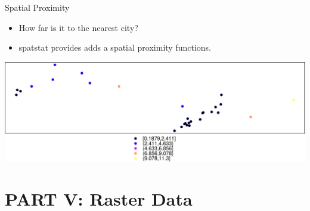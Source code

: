 \documentclass[10pt,ignorenonframetext,]{beamer}
\newenvironment{Shaded}{\begin{snugshade}}{\end{snugshade}}
\newcommand{\KeywordTok}[1]{\textcolor[rgb]{0.13,0.29,0.53}{\textbf{{#1}}}}
\newcommand{\DataTypeTok}[1]{\textcolor[rgb]{0.13,0.29,0.53}{{#1}}}
\newcommand{\StringTok}[1]{\textcolor[rgb]{0.31,0.60,0.02}{{#1}}}
\newcommand{\CommentTok}[1]{\textcolor[rgb]{0.56,0.35,0.01}{\textit{{#1}}}}
\newcommand{\NormalTok}[1]{{#1}}
\providecommand{\tightlist}{%
  \setlength{\itemsep}{0pt}\setlength{\parskip}{0pt}}
\begin{document}
\begin{frame}[fragile]{Spatial Proximity}

\begin{itemize}
\tightlist
\item
  How far is it to the nearest city?
\item
  \alert{spatstat} provides adds a spatial proximity functions.
\end{itemize}

\begin{Shaded}
\end{Shaded}

\begin{center}\includegraphics[width=0.9\linewidth]{SpatialDataLecture_files/figure-beamer/unnamed-chunk-34-1} \end{center}

\end{frame}

\section{PART V: Raster Data}\label{part-v-raster-data}
\end{document}
